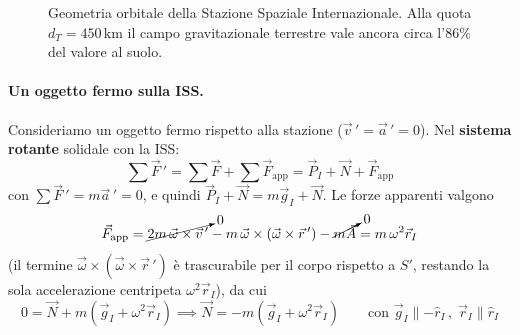 \begin{figure}[ht]
    \centering
    \caption{Geometria orbitale della Stazione Spaziale Internazionale. Alla quota $d_T = 450\,\mathrm{km}$ il campo gravitazionale terrestre vale ancora circa l'$86\%$ del valore al suolo.}
\end{figure}

\paragraph{Un oggetto fermo sulla ISS.}
Consideriamo un oggetto fermo rispetto alla stazione ($\vec{v}\,' = \vec{a}\,' = 0$). Nel \textbf{sistema rotante} solidale con la ISS:
\begin{equation*}
    \sum\vec{F}\,' = \sum\vec{F} + \sum\vec{F}_{\text{app}} = \vec{P}_I + \vec{N} + \vec{F}_{\text{app}}
\end{equation*}
con $\sum\vec{F}\,' = m\vec{a}\,' = 0$, e quindi $\vec{P}_I + \vec{N} = m\vec{g}_I + \vec{N}$. Le forze apparenti valgono
\begin{equation*}
    \vec{F}_{\text{app}} = \cancelto{0}{2m\,\vec{\omega}\times\vec{v}\,'} - m\,\vec{\omega}\times(\vec{\omega}\times\vec{r}\,') - \cancelto{0}{m\vec{A}}
    = m\,\omega^2\vec{r}_I
\end{equation*}
(il termine $\vec{\omega}\times(\vec{\omega}\times\vec{r}\,')$ è trascurabile per il corpo rispetto a $S'$, restando la sola accelerazione centripeta $\omega^2 \vec{r}_I$), da cui
\begin{equation}
    0 = \vec{N} + m\left(\vec{g}_I + \omega^2\vec{r}_I\right)
    \implies \vec{N} = -m\left(\vec{g}_I + \omega^2\vec{r}_I\right)
    \qquad \text{con } \vec{g}_I \parallel -\hat{r}_I \, , \; \vec{r}_I \parallel \hat{r}_I
\end{equation}


